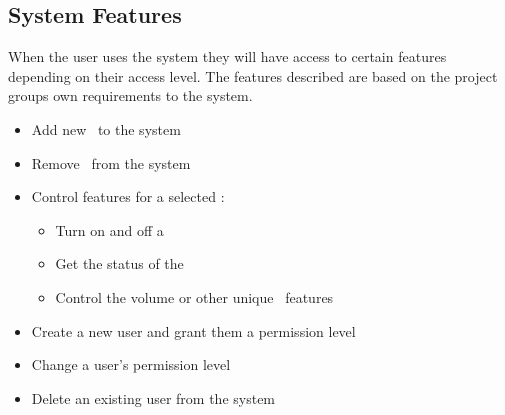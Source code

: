 \subsection{System Features} \label{sec:system-features}
When the user uses the system they will have access to certain features depending on their access level. The features described are based on the project groups own requirements to the system. 

\begin{itemize}
\item Add new \sdevs~to the system
\item Remove \sdevs~from the system
\item Control features for a selected \sdev:
    \begin{itemize}
    \item Turn on and off a \sdev
    \item Get the status of the \sdev
    \item Control the volume or other unique \sdevs~features
    \end{itemize}
\item Create a new user and grant them a permission level
\item Change a user's permission level
\item Delete an existing user from the system
\end{itemize}


